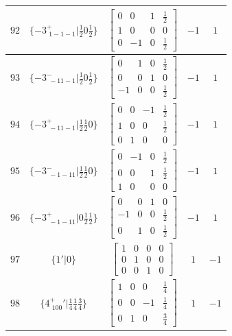 \documentclass[fleqn,8pt]{jsarticle}
\begin{document}
\begin{longtable}{ccccc}
$ 92 $ & $ \{-3^{+}_{\,\,1-1-1}|\frac{1}{2} 0 \frac{1}{2}\} $ & $ \begin{bmatrix} 0 & 0 & 1 & \frac{1}{2} \\ 1 & 0 & 0 & 0 \\ 0 & -1 & 0 & \frac{1}{2} \end{bmatrix} $ & $ -1 $ & $ 1 $ \\ \hline
$ 93 $ & $ \{-3^{-}_{\,\,-11-1}|\frac{1}{2} 0 \frac{1}{2}\} $ & $ \begin{bmatrix} 0 & 1 & 0 & \frac{1}{2} \\ 0 & 0 & 1 & 0 \\ -1 & 0 & 0 & \frac{1}{2} \end{bmatrix} $ & $ -1 $ & $ 1 $ \\ \hline
$ 94 $ & $ \{-3^{+}_{\,\,-11-1}|\frac{1}{2} \frac{1}{2} 0\} $ & $ \begin{bmatrix} 0 & 0 & -1 & \frac{1}{2} \\ 1 & 0 & 0 & \frac{1}{2} \\ 0 & 1 & 0 & 0 \end{bmatrix} $ & $ -1 $ & $ 1 $ \\ \hline
$ 95 $ & $ \{-3^{-}_{\,\,-1-11}|\frac{1}{2} \frac{1}{2} 0\} $ & $ \begin{bmatrix} 0 & -1 & 0 & \frac{1}{2} \\ 0 & 0 & 1 & \frac{1}{2} \\ 1 & 0 & 0 & 0 \end{bmatrix} $ & $ -1 $ & $ 1 $ \\ \hline
$ 96 $ & $ \{-3^{+}_{\,\,-1-11}|0 \frac{1}{2} \frac{1}{2}\} $ & $ \begin{bmatrix} 0 & 0 & 1 & 0 \\ -1 & 0 & 0 & \frac{1}{2} \\ 0 & 1 & 0 & \frac{1}{2} \end{bmatrix} $ & $ -1 $ & $ 1 $ \\ \hline
$ 97 $ & $ \{1{}'|0\} $ & $ \begin{bmatrix} 1 & 0 & 0 & 0 \\ 0 & 1 & 0 & 0 \\ 0 & 0 & 1 & 0 \end{bmatrix} $ & $ 1 $ & $ -1 $ \\ \hline
$ 98 $ & $ \{4^{+}_{\,\,100}{}'|\frac{1}{4} \frac{1}{4} \frac{3}{4}\} $ & $ \begin{bmatrix} 1 & 0 & 0 & \frac{1}{4} \\ 0 & 0 & -1 & \frac{1}{4} \\ 0 & 1 & 0 & \frac{3}{4} \end{bmatrix} $ & $ 1 $ & $ -1 $ \\ \hline

\end{longtable}
\end{document}
